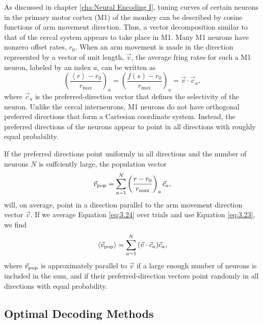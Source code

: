 \begin{exm}
  As discussed in chapter \ref{cha:Neural Encoding I}, tuning curves of certain neurons in the primary
motor cortex (M1) of the monkey can be described by cosine functions of
arm movement direction. Thus, a vector decomposition similar to that
of the cercal system appears to take place in M1. Many M1 neurons have
nonzero offset rates, $r_{0}$. When an arm movement is made in the direction represented by a vector of unit length, $\vec{v}$, the average fring rates for such a M1
neuron, labeled by an index $a$, can be written as
\begin{equation}
  \label{eq:3.23}
  \left( \frac{\left\langle r \right\rangle-r_{0} }{r_{\max}}\right)_{a}=\left( \frac{f(s)-r_{0}}{r_{\max}} \right)_{a}=\vec{v}\cdot\vec{c}_a,
\end{equation}
where $\vec{c}_a$ is the preferred-direction vector that defines the
selectivity of the neuron. Unlike the cercal interneurons, M1 neurons
do not have orthogonal preferred directions that form a Cartesian
coordinate system. Instead, the preferred directions of the neurons appear to point in all directions with
roughly equal probability.
\end{exm}

\begin{prop}
  If the preferred directions point uniformly in all directions and
  the number of neurons $N$ is suffciently large, the population vector
  \begin{equation}
      \label{eq:3.24}
    \vec{v}_{\rm{pop}}=\sum\limits_{a=1}^N \left( \frac{r-r_{0}}{r_{\max}} \right)_a\vec{c}_a,
  \end{equation}
will, on average, point in a direction parallel to the arm movement direction vector $\vec{c}$. If we average Equation \ref{eq:3.24} over
trials and use Equation \ref{eq:3.23}, we find
\begin{equation}
  \label{eq:3.25}
  \left\langle  \vec{v}_{\rm{pop}} \right\rangle=\sum_{a=1}^N{(\vec{v}\cdot\vec{c}_a)\vec{c}_a},
\end{equation}
 where $\vec{v}_{\rm{pop}}$ is approximately parallel
to $\vec{v}$ if a large enough number of neurons is included in the sum, and
if their preferred-direction vectors point randomly in all directions with
equal probability.
\end{prop}

\subsection{Optimal Decoding Methods}


